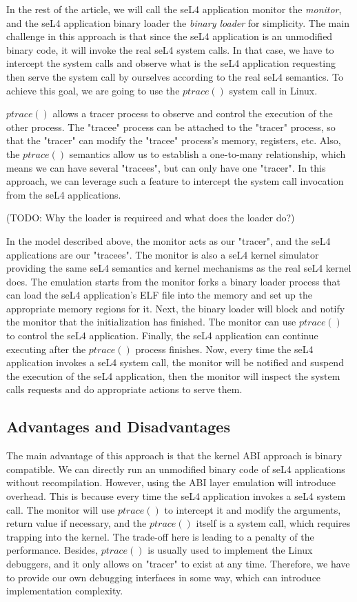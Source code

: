 In the rest of the article, we will call the seL4 application monitor the \emph{monitor}, and the seL4 application binary loader the \emph{binary loader} for simplicity. The main challenge in this approach is that since the seL4 application is an unmodified binary code, it will invoke the real seL4 system calls. In that case, we have to intercept the system calls and observe what is the seL4 application requesting then serve the system call by ourselves according to the real seL4 semantics. To achieve this goal, we are going to use the $ptrace()$ system call in Linux.

$ptrace()$ allows a tracer process to observe and control the execution of the other process. The "tracee" process can be attached to the "tracer" process, so that the "tracer" can modify the "tracee" process's memory, registers, etc. Also, the $ptrace()$ semantics allow us to establish a one-to-many relationship, which means we can have several "tracees", but can only have one "tracer". In this approach, we can leverage such a feature to intercept the system call invocation from the seL4 applications.

(TODO: Why the loader is requireed and what does the loader do?)

In the model described above, the monitor acts as our "tracer", and the seL4 applications are our "tracees". The monitor is also a seL4 kernel simulator providing the same seL4 semantics and kernel mechanisms as the real seL4 kernel does. The emulation starts from the monitor forks a binary loader process that can load the seL4 application's ELF file into the memory and set up the appropriate memory regions for it. Next, the binary loader will block and notify the monitor that the initialization has finished. The monitor can use $ptrace()$ to control the seL4 application. Finally, the seL4 application can continue executing after the $ptrace()$ process finishes. Now, every time the seL4 application invokes a seL4 system call, the monitor will be notified and suspend the execution of the seL4 application, then the monitor will inspect the system calls requests and do appropriate actions to serve them.

\subsection{Advantages and Disadvantages}
The main advantage of this approach is that the kernel ABI approach is binary compatible. We can directly run an unmodified binary code of seL4 applications without recompilation. However, using the ABI layer emulation will introduce overhead. This is because every time the seL4 application invokes a seL4 system call. The monitor will use $ptrace()$ to intercept it and modify the arguments, return value if necessary, and the $ptrace()$ itself is a system call, which requires trapping into the kernel. The trade-off here is leading to a penalty of the performance. Besides, $ptrace()$ is usually used to implement the Linux debuggers, and it only allows on "tracer" to exist at any time. Therefore, we have to provide our own debugging interfaces in some way, which can introduce implementation complexity.  

